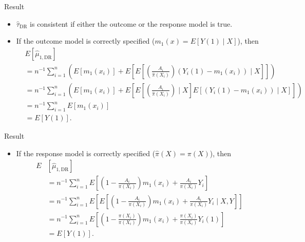 \documentclass[handout]{beamer} %
\begin{document}
\begin{frame}{Result}

\begin{itemize}
    \item $\hat \tau_{\text{DR}}$ is consistent if either the outcome or the
      response model is true.
    \item If the outcome model is correctly specified ($m_1(x) = E[Y(1) \mid
      X]$), then
      {\footnotesize
    \begin{align*}
      &E[\hat \mu_{1, \text{DR}}] \\
    &=  n^{-1} \sum_{i = 1}^n \left(E[m_1(x_i)] + 
      E\left[E\left[\left(\frac{A_i}{\hat \pi(X_i)}\right) (Y_i(1) - m_1(x_i)) 
      \mid X \right]\right] \right)\\
    &=  n^{-1} \sum_{i = 1}^n \left(E[m_1(x_i)] + 
      E\left[E\left[\left(\frac{A_i}{\hat \pi(X_i)}\right) \mid X\right] 
      E\left[(Y_i(1) - m_1(x_i))
      \mid X\right]\right] \right)\\
    &=  n^{-1} \sum_{i = 1}^n E[m_1(x_i)]\\
    &=  E[Y(1)].
    \end{align*}
    }
\end{itemize}

\end{frame}

\begin{frame}{Result}

\begin{itemize}
    \item If the response model is correctly specified ($\hat \pi(X) = \pi(X)$),
      then
    \begin{align*}
      E&[\hat \mu_{1, \text{DR}}] \\
    &=  n^{-1} \sum_{i = 1}^n E\left[\left(1 - \frac{A_i}{\pi(X_i)}\right)m_1(x_i) 
    + \frac{A_i}{\pi(X_i)}Y_i\right]\\
    &=  n^{-1} \sum_{i = 1}^n E\left[E\left[\left(1 - \frac{A_i}{\pi(X_i)}\right)m_1(x_i) 
    + \frac{A_i}{\pi(X_i)}Y_i\mid X, Y\right]\right]\\
    &=  n^{-1} \sum_{i = 1}^n E\left[\left(1 - \frac{\pi(X_i)}{\pi(X_i)}\right)m_1(x_i) 
    + \frac{\pi(X_i)}{\pi(X_i)}Y_i(1)\right]\\
    &= E[Y(1)].
    \end{align*}
\end{itemize}
    
\end{frame}
\end{document}
